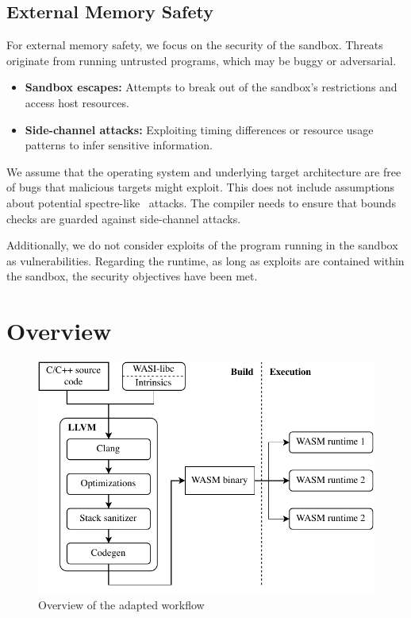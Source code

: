 \subsection{External Memory Safety}
\label{subsec:external-memory-safety}

For external memory safety, we focus on the security of the sandbox.
Threats originate from running untrusted programs, which may be buggy or adversarial.

\begin{itemize}
    \item \textbf{Sandbox escapes:} Attempts to break out of the sandbox's restrictions and access host resources.
    \item \textbf{Side-channel attacks:} Exploiting timing differences or resource usage patterns to infer sensitive information.
\end{itemize}

We assume that the operating system and underlying target architecture are free of bugs that malicious targets might exploit.
This does not include assumptions about potential spectre-like~\cite{kocher2020spectre} attacks.
The compiler needs to ensure that bounds checks are guarded against side-channel attacks.

Additionally, we do not consider exploits of the program running in the sandbox as vulnerabilities.
Regarding the runtime, as long as exploits are contained within the sandbox, the security objectives have been met.

\section{Overview}
\label{sec:overview}

\begin{figure}[t]
    \centering
    \includegraphics{figures/build/overview}
    \caption{Overview of the adapted workflow}
    \label{fig:overview}
\end{figure}


